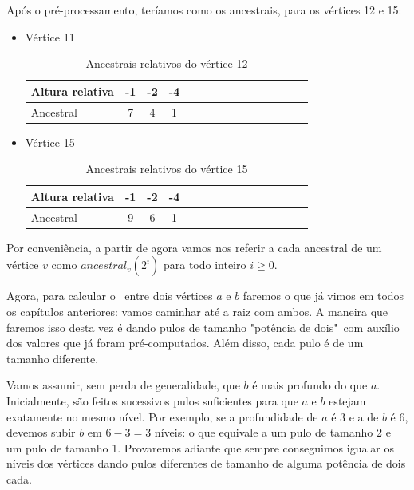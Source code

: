 Após o pré-processamento, teríamos como os ancestrais, para os vértices 12 e 15:

\begin{itemize}
    \item Vértice 11

    \begin{table}[htb]
    \centering
    \begin{tabular}{|l|c|c|c|c|c|c|c|c|c|c|c|c|c|c|}
    \hline
    Altura relativa & -1 & -2 & -4 \\ \hline
    Ancestral       & 7 & 4  & 1 \\ \hline
    \end{tabular}
    \caption{Ancestrais relativos do vértice 12}
    \end{table}
    
    \item Vértice 15
    
    \begin{table}[htb]
    \centering
    \begin{tabular}{|l|c|c|c|c|c|c|c|c|c|c|c|c|c|c|}
    \hline
    Altura relativa & -1 & -2 & -4 \\ \hline
    Ancestral       & 9  & 6  & 1 \\ \hline
    \end{tabular}
    \caption{Ancestrais relativos do vértice 15}
    \end{table}

\end{itemize}

Por conveniência, a partir de agora vamos nos referir a cada ancestral de um vértice $v$ como $ancestral_v(2^i)$ para todo inteiro $i \geq 0$.

Agora, para calcular o \LCA\ entre dois vértices $a$ e $b$ faremos o que já vimos em todos os capítulos anteriores: vamos caminhar até a raiz com ambos. A maneira que faremos isso desta vez é dando pulos de tamanho "potência de dois"\  com auxílio dos valores que já foram pré-computados. Além disso, cada pulo é de um tamanho diferente.

Vamos assumir, sem perda de generalidade, que $b$ é mais profundo do que $a$. Inicialmente, são feitos sucessivos pulos suficientes para que $a$ e $b$ estejam exatamente no mesmo nível. Por exemplo, se a profundidade de $a$ é 3 e a de $b$ é 6, devemos subir $b$ em $6 - 3 = 3$ níveis: o que equivale a um pulo de tamanho 2 e um pulo de tamanho 1. Provaremos adiante que sempre conseguimos igualar os níveis dos vértices dando pulos diferentes de tamanho de alguma potência de dois cada.

